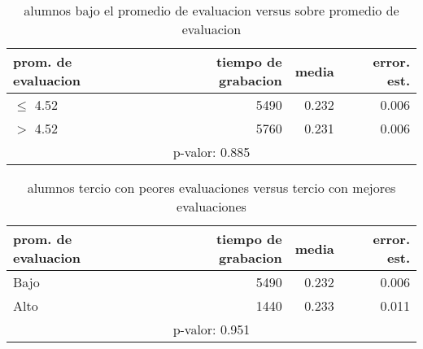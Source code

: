 \documentclass[spanish]{article}
\begin{document}
\begin{table}[h!]
\begin{center}
\begin{tabular}{|l|r|r|r|}
\hline
prom. de evaluacion & tiempo de grabacion & media          & error. est.     \\ \hline
$\leq$ 4.52             &                5490 &          0.232 &            0.006\\ \hline
$>$ 4.52              &                5760 &          0.231 &            0.006\\ \hline
\multicolumn{4}{|c|}{p-valor: 0.885} \\ \hline
\end{tabular}
\caption{alumnos bajo el promedio de evaluacion versus sobre promedio de evaluacion}
\end{center}
\end{table}

\begin{table}[h!]
\begin{center}
\begin{tabular}{|l|r|r|r|}
\hline
prom. de evaluacion & tiempo de grabacion & media          & error. est.     \\ \hline
Bajo                &                5490 &          0.232 &            0.006\\ \hline
Alto                &                1440 &          0.233 &            0.011\\ \hline
\multicolumn{4}{|c|}{p-valor: 0.951} \\ \hline
\end{tabular}
\caption{alumnos tercio con peores evaluaciones versus tercio con mejores evaluaciones}
\end{center}
\end{table}
\end{document}
